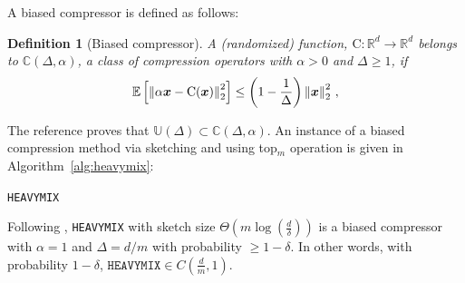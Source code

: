 \documentclass[twoside]{article}
\newtheorem{lemma}{Lemma}
\newtheorem{definition}{Definition}
\begin{document}
A biased compressor is defined as follows:
\begin{definition}[Biased compressor]
A (randomized) function,  ${\text{C}}:\mathbb{R}^{d}\rightarrow\mathbb{R}^{d}$ belongs to $\mathbb{C}(\Delta,\alpha)$, a class of compression operators with $\alpha>0$ and $\Delta\geq 1$, if
\begin{align}\notag
    \mathbb{E}\left[\left\|\alpha\boldsymbol{x}-{\text{C}}(\boldsymbol{x})\right\|^2_2\right]\leq \left(1-\frac{1}{\Delta}\right)\left\|\boldsymbol{x}\right\|^2_2\, ,
\end{align}
\end{definition}
The reference \cite{horvath2020better} proves that $\mathbb{U}(\Delta)\subset\mathbb{C}(\Delta, \alpha)$.
An instance of a biased compression method via sketching and using top$_m$ operation is given in Algorithm~\ref{alg:heavymix}:
\begin{algorithm}[H]
\caption{\texttt{HEAVYMIX}  }\label{alg:heavymix}
\begin{algorithmic}[1]
\end{algorithmic}
\end{algorithm}
Following \cite{ivkin2019communication}, \texttt{HEAVYMIX} with sketch size $\Theta\left(m\log\left(\frac{d}{\delta}\right)\right)$ is a biased compressor with $\alpha=1$ and  $\Delta=d/m$ with probability $\geq1-\delta$. In other words, with probability $1-\delta$, $\texttt{HEAVYMIX}\in C(\frac{d}{m},1)$. 
\end{document}
